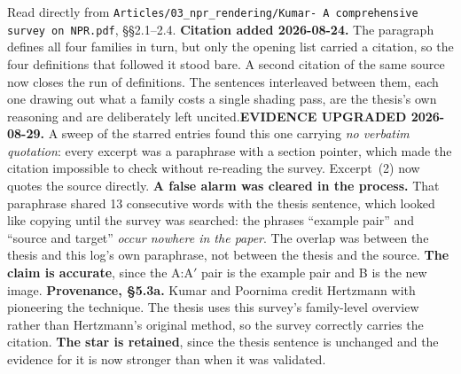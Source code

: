 \documentclass[11pt, a4paper]{article}
\begin{document}
\begin{Form}
  {Read directly from \texttt{\footnotesize Articles/03\_npr\_rendering/Kumar- A comprehensive survey on NPR.pdf}, \S\S2.1--2.4. \textbf{Citation added 2026-08-24.} The paragraph defines all four families in turn, but only the opening list carried a citation, so the four definitions that followed it stood bare. A second citation of the same source now closes the run of definitions. The sentences interleaved between them, each one drawing out what a family costs a single shading pass, are the thesis's own reasoning and are deliberately left uncited.\textbf{EVIDENCE UPGRADED 2026-08-29.} A sweep of the starred entries found this one carrying \emph{no verbatim quotation}: every excerpt was a paraphrase with a section pointer, which made the citation impossible to check without re-reading the survey. Excerpt~(2) now quotes the source directly. \textbf{A false alarm was cleared in the process.} That paraphrase shared 13 consecutive words with the thesis sentence, which looked like copying until the survey was searched: the phrases ``example pair'' and ``source and target'' \emph{occur nowhere in the paper}. The overlap was between the thesis and this log's own paraphrase, not between the thesis and the source. \textbf{The claim is accurate}, since the A:A$'$ pair is the example pair and B is the new image. \textbf{Provenance, \S5.3a.} Kumar and Poornima credit Hertzmann with pioneering the technique. The thesis uses this survey's family-level overview rather than Hertzmann's original method, so the survey correctly carries the citation. \textbf{The star is retained}, since the thesis sentence is unchanged and the evidence for it is now stronger than when it was validated.}


\end{Form}
\end{document}
